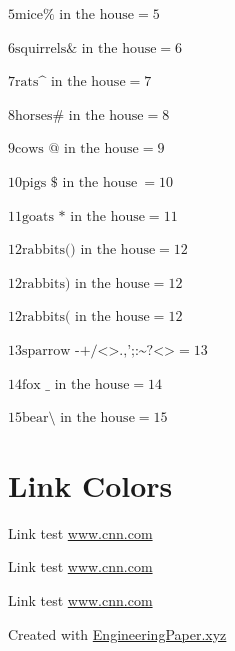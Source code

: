 \documentclass[
  a4paper,
]{article}
\begin{document}
\(5\text{mice\%{} in the house}= 5\)

\(6\text{squirrels\&{} in the house}= 6\)

\(7\text{rats\textasciicircum{} in the house}= 7\)

\(8\text{horses\#{} in the house}= 8\)

\(9\text{cows @ in the house}= 9\)

\(10\text{pigs \${} in the house}\:= 10\)

\(11\text{goats * in the house}= 11\)

\(12\text{rabbits() in the house}= 12\)

\(12\text{rabbits) in the house}= 12\)

\(12\text{rabbits( in the house}= 12\)

\(13\text{sparrow -+/<>.,';:\textasciitilde{}?<>}= 13\)

\(14\text{fox \_{} in the house}= 14\)

\(15\text{bear\textbackslash{} in the house}= 15\)

\section{Link Colors}\label{link-colors}

Link test \href{https://www.cnn.com}{www.cnn.com}

Link test
\href{https://www.cnn.com}{{\textcolor[HTML]{F06666}{\colorbox[HTML]{FFFF66}{www.cnn.com}}}}

{\textcolor[HTML]{66B966}{\colorbox[HTML]{FFFFCC}{Link test
\href{https://www.cnn.com}{www.cnn.com}}}}

Created with \href{https://engineeringpaper.xyz}{EngineeringPaper.xyz}
\end{document}
